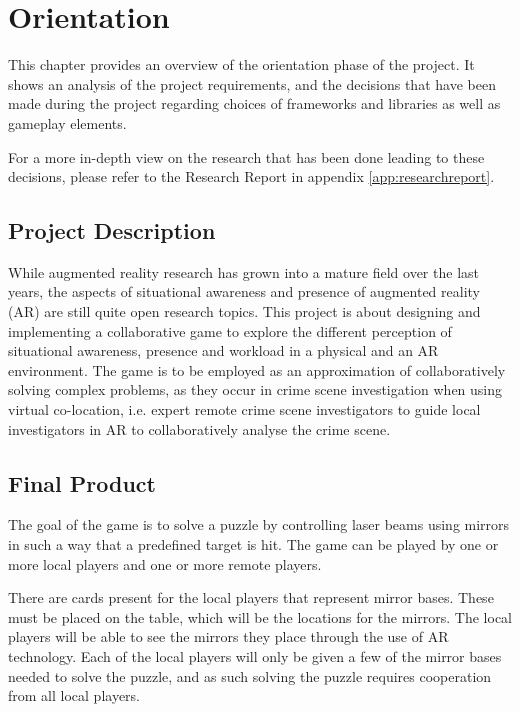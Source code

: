 \chapter{Orientation} \label{cha:orientation}

  This chapter provides an overview of the orientation phase of the project.
  It shows an analysis of the project requirements, and the decisions that
  have been made during the project regarding choices of frameworks and
  libraries as well as gameplay elements.

  For a more in-depth view on the research that has been done leading to
  these decisions, please refer to the Research Report in appendix
  \ref{app:researchreport}.

  \section{Project Description} \label{sec:projectdescription}
    While augmented reality research has grown into a mature field over the
    last years, the aspects of situational awareness and presence of
    augmented reality (AR) are still quite open research topics. This
    project is about designing and implementing a collaborative game to
    explore the different perception of situational awareness, presence and
    workload in a physical and an AR environment. The game is to be employed
    as an approximation of collaboratively solving complex problems, as they
    occur in crime scene investigation when using virtual co-location, i.e.
    expert remote crime scene investigators to guide local investigators in
    AR to collaboratively analyse the crime scene.

  \section{Final Product} \label{sec:finalproduct}
    The goal of the game is to solve a puzzle by controlling laser beams
    using mirrors in such a way that a predefined target is hit. The game
    can be played by one or more local players and one or more remote players.

    There are cards present for the local players that represent mirror
    bases. These must be placed on the table, which will be the locations
    for the mirrors. The local players will be able to see the mirrors they
    place through the use of AR technology. Each of the local players will
    only be given a few of the mirror bases needed to solve the puzzle, and
    as such solving the puzzle requires cooperation from all local players.


